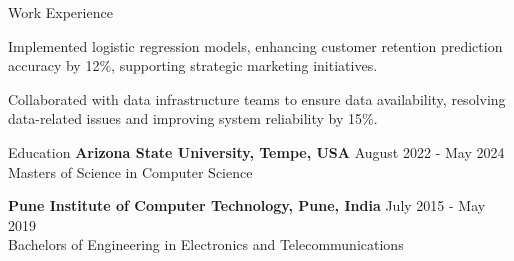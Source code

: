\documentclass{resume} %
\begin{document}
\begin{rSection}{Work Experience}
\begin{rSubsection}
                                    \item Implemented logistic regression models, enhancing customer retention prediction accuracy by 12\%, supporting strategic marketing initiatives.
                                    \item Collaborated with data infrastructure teams to ensure data availability, resolving data{-}related issues and improving system reliability by 15\%.
                            \end{rSubsection}
            \end{rSection}

\begin{rSection}{Education}
                        \textbf{Arizona State University, Tempe, USA} \hfill {August 2022 - May 2024} \\
                            {Masters of Science in Computer Science}
                         
             
         
                        \textbf{Pune Institute of Computer Technology, Pune, India} \hfill {July 2015 - May 2019} \\
                            {Bachelors of Engineering in Electronics and Telecommunications}
                         
             
         
    \end{rSection}
\end{document}
